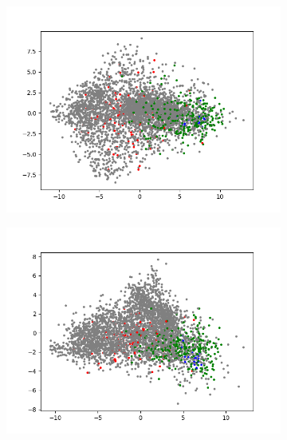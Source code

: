 \begin{figure}[H]
    \centering
    \begin{subfigure}{.25\textwidth}
        \centering
        \includegraphics[width=\textwidth]{images/figures/experiments_latent/pooling_dim1024_PCA_classes.png}
    \end{subfigure}%
    \begin{subfigure}{.25\textwidth}
        \centering
        \includegraphics[width=\textwidth]{images/figures/experiments_latent/pooling_dim512_PCA_classes.png}
    \end{subfigure}%
    \begin{subfigure}{.25\textwidth}
        \centering

\end{subfigure}
\end{figure}
